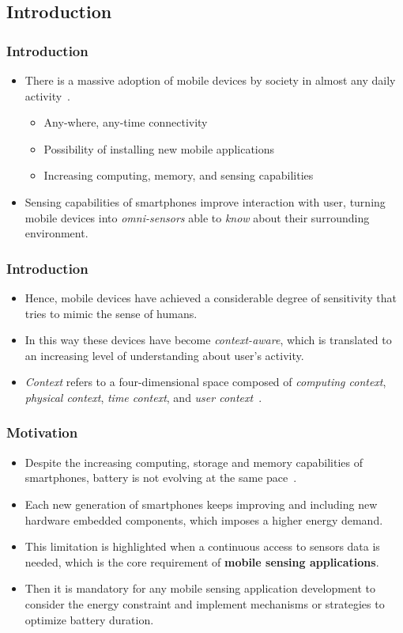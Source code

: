\documentclass[compress,9pt,xcolor={dvipsnames,table}]{beamer}
\begin{document}
\subsection{Introduction}
\begin{frame}\frametitle{Introduction}
\begin{itemize}
	\item There is a massive adoption of mobile devices by society in almost any daily activity~\cite{Islam2014}.
	\begin{itemize}
		\item Any-where, any-time connectivity
		\item Possibility of installing new mobile applications
		\item Increasing computing, memory, and sensing capabilities
	\end{itemize}
	\item Sensing capabilities of smartphones improve interaction with user, turning mobile devices into \emph{omni-sensors} able to \emph{know} about their surrounding environment.
\end{itemize}
\end{frame}

\begin{frame}\frametitle{Introduction}
\begin{itemize}
	\item Hence, mobile devices have achieved a considerable degree of sensitivity that tries to mimic the sense of humans.
	\item In this way these devices have become \emph{context-aware}, which is translated to an increasing level of understanding about user's activity.
  \item \emph{Context} refers to a four-dimensional space composed of \emph{computing context}, \emph{physical context}, \emph{time context}, and \emph{user context}~\cite{Chen2000}.
\end{itemize}
\end{frame}


\begin{frame}\frametitle{Motivation}
\begin{itemize}
	\item Despite the increasing computing, storage and memory capabilities of smartphones, battery is not evolving at the same pace~\cite{Kjaergaard2012}.
	\item Each new generation of smartphones keeps improving and including new hardware embedded components, which imposes a higher energy demand.
	\item This limitation is highlighted when a continuous access to sensors data is needed, which is the core requirement of \textbf{mobile sensing applications}.
  \item Then it is mandatory for any mobile sensing application development to consider the energy constraint and implement mechanisms or strategies to optimize battery duration.
\end{itemize}
\end{frame}
\end{document}

